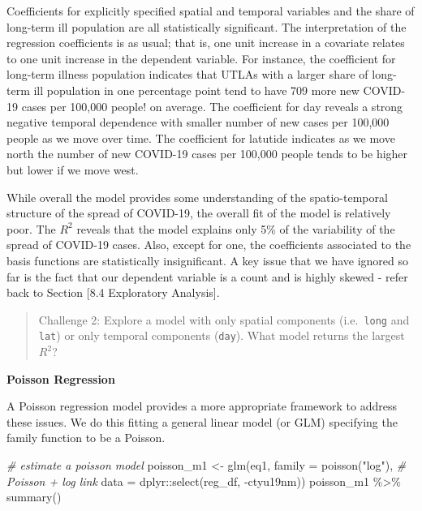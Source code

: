 \documentclass[
]{book}
\newenvironment{Shaded}{\begin{snugshade}}{\end{snugshade}}
\newcommand{\AttributeTok}[1]{\textcolor[rgb]{0.77,0.63,0.00}{#1}}
\newcommand{\CommentTok}[1]{\textcolor[rgb]{0.56,0.35,0.01}{\textit{#1}}}
\newcommand{\FunctionTok}[1]{\textcolor[rgb]{0.00,0.00,0.00}{#1}}
\newcommand{\NormalTok}[1]{#1}
\newcommand{\OtherTok}[1]{\textcolor[rgb]{0.56,0.35,0.01}{#1}}
\newcommand{\SpecialCharTok}[1]{\textcolor[rgb]{0.00,0.00,0.00}{#1}}
\newcommand{\StringTok}[1]{\textcolor[rgb]{0.31,0.60,0.02}{#1}}
\begin{document}
Coefficients for explicitly specified spatial and temporal variables and the share of long-term ill population are all statistically significant. The interpretation of the regression coefficients is as usual; that is, one unit increase in a covariate relates to one unit increase in the dependent variable. For instance, the coefficient for long-term illness population indicates that UTLAs with a larger share of long-term ill population in one percentage point tend to have 709 more new COVID-19 cases per 100,000 people! on average. The coefficient for day reveals a strong negative temporal dependence with smaller number of new cases per 100,000 people as we move over time. The coefficient for latutide indicates as we move north the number of new COVID-19 cases per 100,000 people tends to be higher but lower if we move west.

While overall the model provides some understanding of the spatio-temporal structure of the spread of COVID-19, the overall fit of the model is relatively poor. The \(R^{2}\) reveals that the model explains only 5\% of the variability of the spread of COVID-19 cases. Also, except for one, the coefficients associated to the basis functions are statistically insignificant. A key issue that we have ignored so far is the fact that our dependent variable is a count and is highly skewed - refer back to Section {[}8.4 Exploratory Analysis{]}.

\begin{quote}
Challenge 2: Explore a model with only spatial components (i.e.~\texttt{long} and \texttt{lat}) or only temporal components (\texttt{day}). What model returns the largest \(R^{2}\)?
\end{quote}

\textbf{Poisson Regression}

A Poisson regression model provides a more appropriate framework to address these issues. We do this fitting a general linear model (or GLM) specifying the family function to be a Poisson.

\begin{Shaded}
\begin{Highlighting}[]
\CommentTok{\# estimate a poisson model}
\NormalTok{poisson\_m1 }\OtherTok{\textless{}{-}} \FunctionTok{glm}\NormalTok{(eq1,}
                \AttributeTok{family =} \FunctionTok{poisson}\NormalTok{(}\StringTok{"log"}\NormalTok{), }\CommentTok{\# Poisson + log link}
                \AttributeTok{data =}\NormalTok{ dplyr}\SpecialCharTok{::}\FunctionTok{select}\NormalTok{(reg\_df, }\SpecialCharTok{{-}}\NormalTok{ctyu19nm))}
\NormalTok{poisson\_m1 }\SpecialCharTok{\%\textgreater{}\%} \FunctionTok{summary}\NormalTok{()}
\end{Highlighting}
\end{Shaded}
\end{document}
